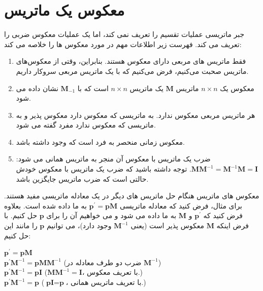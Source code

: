 \section{\textbf{معکوس یک ماتریس}}
\label{sec:2.7}
{
    \Large
    \begin{spacing}{1.5}
        جبر ماتریسی عملیات تقسیم را تعریف نمی کند، اما یک عملیات معکوس ضربی را تعریف می کند. فهرست زیر اطلاعات مهم در مورد معکوس ها را خلاصه می کند:

        \begin{enumerate}[label=\textbf{\arabic*}.]
            \item {فقط ماتریس های مربعی دارای معکوس هستند.
            بنابراین، وقتی از معکوس‌های ماتریس صحبت می‌کنیم، فرض می‌کنیم که با یک ماتریس مربعی سروکار داریم.}

            \item {معکوس یک $n\times n$ ماتریس $\textbf{M}$ یک ماتریس $n\times n$ است که با $\textbf{M}_{-1}$ نشان داده می شود.}

            \item {هر ماتریس مربعی معکوس ندارد.
            به ماتریسی که معکوس دارد معکوس پذیر و به ماتریسی که معکوس ندارد مفرد گفته می شود.}

            \item {معکوس زمانی منحصر به فرد است که وجود داشته باشد.}

            \item {ضرب یک ماتریس با معکوس آن منجر به ماتریس همانی می شود: $\textbf{M}\textbf{M}^{-1}=\textbf{M}^{-1}\textbf{M}=\textbf{I}$.
            توجه داشته باشید که ضرب یک ماتریس با معکوس خودش حالتی است که ضرب ماتریس جایگزین باشد.}
        \end{enumerate}

        معکوس های ماتریس هنگام حل ماتریس های دیگر در یک معادله ماتریسی مفید هستند.
        برای مثال، فرض کنید که معادله ماتریسی $\textbf{p}^{\prime}=\textbf{p}\textbf{M}$ به ما داده شده است.
        بعلاوه فرض کنید که $\textbf{p}^{\prime}$ و $\textbf{M}$ به ما داده می شود و می خواهیم آن را برای $\textbf{p}$ حل کنیم.
        با فرض اینکه $\textbf{M}$ معکوس پذیر است (یعنی $\textbf{M}^{-1}$ وجود دارد)، می توانیم $\textbf{p}$ را مانند این حل کنیم:

        \begin{center}
            $\textbf{p}^{\prime}=\textbf{p}\textbf{M}$\\
            $\textbf{p}^{\prime}\textbf{M}^{-1}=\textbf{p}\textbf{M}\textbf{M}^{-1}$ (ضرب دو طرف معادله در $\textbf{M}^{-1}$)\\
            $\textbf{p}^{\prime}\textbf{M}^{-1}=\textbf{p}\textbf{I}$ ($\textbf{M}\textbf{M}^{-1}=\textbf{I}$، با تعریف معکوس.)\\
            $\textbf{p}^{\prime}\textbf{M}^{-1}=\textbf{p}$ ($\textbf{p}\textbf{I}=\textbf{p}$، با تعریف ماتریس همانی.)
        \end{center}


\end{spacing}}
